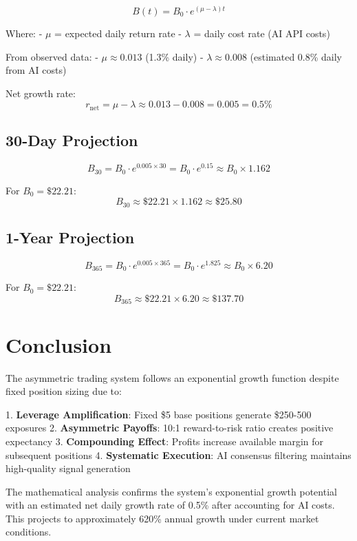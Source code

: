 \documentclass{article}
\begin{document}
\begin{equation}
B(t) = B_0 \cdot e^{(\mu - \lambda)t}
\end{equation}

Where:
- $\mu$ = expected daily return rate
- $\lambda$ = daily cost rate (AI API costs)

From observed data:
- $\mu \approx 0.013$ (1.3\% daily)
- $\lambda \approx 0.008$ (estimated 0.8\% daily from AI costs)

Net growth rate:
\begin{equation}
r_{\text{net}} = \mu - \lambda \approx 0.013 - 0.008 = 0.005 = 0.5\%
\end{equation}

\subsection{30-Day Projection}

\begin{equation}
B_{30} = B_0 \cdot e^{0.005 \times 30} = B_0 \cdot e^{0.15} \approx B_0 \times 1.162
\end{equation}

For $B_0 = \$22.21$:
\begin{equation}
B_{30} \approx \$22.21 \times 1.162 \approx \$25.80
\end{equation}

\subsection{1-Year Projection}

\begin{equation}
B_{365} = B_0 \cdot e^{0.005 \times 365} = B_0 \cdot e^{1.825} \approx B_0 \times 6.20
\end{equation}

For $B_0 = \$22.21$:
\begin{equation}
B_{365} \approx \$22.21 \times 6.20 \approx \$137.70
\end{equation}

\section{Conclusion}

The asymmetric trading system follows an exponential growth function despite fixed position sizing due to:

1. \textbf{Leverage Amplification}: Fixed \$5 base positions generate \$250-500 exposures
2. \textbf{Asymmetric Payoffs}: 10:1 reward-to-risk ratio creates positive expectancy
3. \textbf{Compounding Effect}: Profits increase available margin for subsequent positions
4. \textbf{Systematic Execution}: AI consensus filtering maintains high-quality signal generation

The mathematical analysis confirms the system's exponential growth potential with an estimated net daily growth rate of 0.5\% after accounting for AI costs. This projects to approximately 620\% annual growth under current market conditions.
\end{document}

